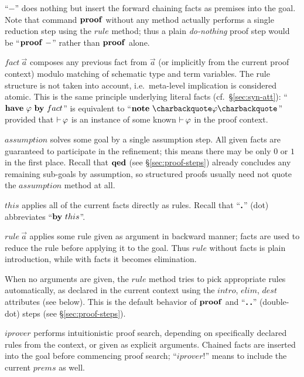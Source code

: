 \begin{descr}
  
\item [``$-$''] does nothing but insert the forward chaining facts as premises
  into the goal.  Note that command ${\mathord{\mathbf{proof}}}$ without any method actually
  performs a single reduction step using the $rule$ method; thus a plain
  \emph{do-nothing} proof step would be ``$\PROOF{-}$'' rather than
  ${\mathord{\mathbf{proof}}}$ alone.
  
\item [$fact~\vec a$] composes any previous fact from $\vec a$ (or implicitly
  from the current proof context) modulo matching of schematic type and term
  variables.  The rule structure is not taken into account, i.e.\ meta-level
  implication is considered atomic.  This is the same principle underlying
  literal facts (cf.\ \S\ref{sec:syn-att}): ``$\HAVE{}{\phi}~\BY{fact}$'' is
  equivalent to ``$\NOTE{}{\backquote\phi\backquote}$'' provided that $\mathop{\mathrel{\vdash}}\nolimits
  \varphi$ is an instance of some known $\mathop{\mathrel{\vdash}}\nolimits \varphi$ in the proof context.
  
\item [$assumption$] solves some goal by a single assumption step.  All given
  facts are guaranteed to participate in the refinement; this means there may
  be only $0$ or $1$ in the first place.  Recall that ${\mathord{\mathbf{qed}}}$ (see
  \S\ref{sec:proof-steps}) already concludes any remaining sub-goals by
  assumption, so structured proofs usually need not quote the $assumption$
  method at all.
  
\item [$this$] applies all of the current facts directly as rules.  Recall
  that ``$\textbf{.}$'' (dot) abbreviates ``$\BY{this}$''.
  
\item [$rule~\vec a$] applies some rule given as argument in backward manner;
  facts are used to reduce the rule before applying it to the goal.  Thus
  $rule$ without facts is plain introduction, while with facts it becomes
  elimination.
  
  When no arguments are given, the $rule$ method tries to pick appropriate
  rules automatically, as declared in the current context using the $intro$,
  $elim$, $dest$ attributes (see below).  This is the default behavior of
  ${\mathord{\mathbf{proof}}}$ and ``$\textbf{.\,.}$'' (double-dot) steps (see
  \S\ref{sec:proof-steps}).
  
\item [$iprover$] performs intuitionistic proof search, depending on
  specifically declared rules from the context, or given as explicit
  arguments.  Chained facts are inserted into the goal before commencing proof
  search; ``$iprover!$'' means to include the current $prems$ as well.
  

\end{descr}

